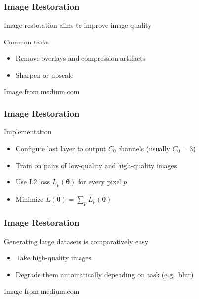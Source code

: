 \documentclass[xetex,professionalfont]{beamer}
\renewcommand\emph[1]{\textcolor{tuwcvl_cvl_blue}{#1}}
\newcommand{\bth}{\boldsymbol{\theta}}
\begin{document}
\begin{frame}
	\frametitle{Image Restoration}

	\emph{Image restoration} aims to improve image quality

	\bigskip

	Common tasks
	\begin{itemize}
		\item Remove overlays and compression artifacts
		\item Sharpen or upscale
	\end{itemize}

	\medskip

	\begin{center}
		{\centering Image from medium.com}
	\end{center}

\end{frame}


\begin{frame}
	\frametitle{Image Restoration}

	Implementation
	\begin{itemize}
		\item Configure last layer to output $C_0$ channels (usually $C_0=3$)
		\item Train on pairs of low-quality and high-quality images
		\item Use L2 loss $L_p(\bth)$ for every pixel $p$
		\item Minimize $L(\bth)=\sum_pL_p(\bth)$
	\end{itemize}

\end{frame}


\begin{frame}
	\frametitle{Image Restoration}

	Generating large datasets is comparatively easy %
	\begin{itemize}
		\item Take high-quality images
		\item Degrade them automatically depending on task (e.g.~blur) %
	\end{itemize}

	\bigskip

	\begin{center}
		{\centering Image from medium.com}
	\end{center}

\end{frame}
\end{document}
